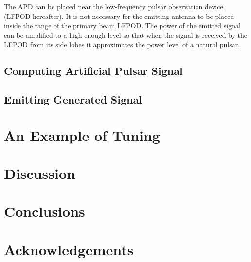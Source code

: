 \documentclass[fleqn,usenatbib]{mnras}
\begin{document}
The APD can be placed near the low-frequency pulsar observation device (LFPOD hereafter). 
It is not necessary for the emitting antenna to be placed inside the range of the primary beam LFPOD.
The power of the emitted signal can be amplified to a high enough level so that when the signal is received by the LFPOD from its side lobes it approximates the power level of a natural pulsar.

\subsection{Computing Artificial Pulsar Signal}

\subsection{Emitting Generated Signal}

\section{An Example of Tuning}

\section{Discussion}

\section{Conclusions}

\section*{Acknowledgements}








\bsp	%
\label{lastpage}
\end{document}
